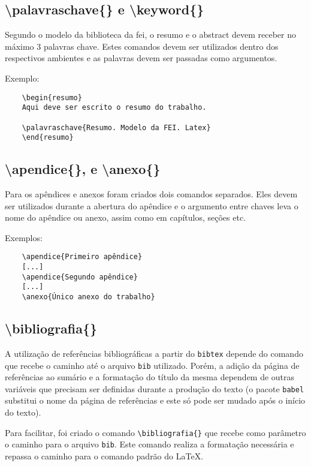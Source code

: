 \documentclass{fei}
\begin{document}
    \subsection{\textbackslash palavraschave\{\} e \textbackslash keyword\{\}}
    Segundo o modelo da biblioteca da \gls{fei}, o resumo e o abstract devem receber no máximo 3 palavras chave. Estes comandos devem ser utilizados dentro dos respectivos ambientes e as palavras devem ser passadas como argumentos.

    Exemplo:
    \begin{verbatim}
    \begin{resumo}
    Aqui deve ser escrito o resumo do trabalho.

    \palavraschave{Resumo. Modelo da FEI. Latex}
    \end{resumo}
    \end{verbatim}
    
    \subsection{\textbackslash apendice\{\}, e \textbackslash anexo\{\}}
    Para os apêndices e anexos foram criados dois comandos separados. Eles devem ser utilizados durante a abertura do apêndice e o argumento entre chaves leva o nome do apêndice ou anexo, assim como em capítulos, seções etc.
    
    Exemplos:
    
    \begin{verbatim}
    \apendice{Primeiro apêndice}
    [...]
    \apendice{Segundo apêndice}
    [...]
    \anexo{Único anexo do trabalho}
    \end{verbatim}

    \subsection{\textbackslash bibliografia\{\}}
    A utilização de referências bibliográficas a partir do \texttt{bibtex} depende do comando \verb++ que recebe o caminho até o arquivo \texttt{bib} utilizado. Porém, a adição da página de referências ao sumário e a formatação do título da mesma dependem de outras variáveis que precisam ser definidas durante a produção do texto (o pacote \texttt{babel} substitui o nome da página de referências e este só pode ser mudado após o início do texto).

    Para facilitar, foi criado o comando \verb+\bibliografia{}+ que recebe como parâmetro o caminho para o arquivo \texttt{bib}. Este comando realiza a formatação necessária e repassa o caminho para o comando \verb++ padrão do \LaTeX.
\end{document}
